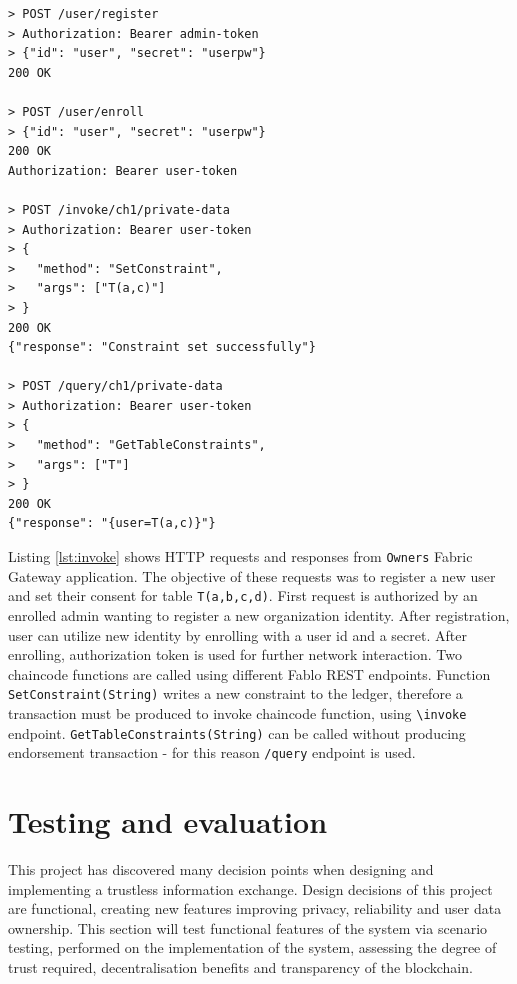 \documentclass[12pt]{article}
\begin{document}
    \begin{lstlisting}[style=http,
        caption={HTTP requests to issue Owners identities and set constraints}, label={lst:invoke}]
> POST /user/register
> Authorization: Bearer admin-token
> {"id": "user", "secret": "userpw"}
200 OK

> POST /user/enroll
> {"id": "user", "secret": "userpw"}
200 OK
Authorization: Bearer user-token

> POST /invoke/ch1/private-data
> Authorization: Bearer user-token
> {
>   "method": "SetConstraint",
>   "args": ["T(a,c)"]
> }
200 OK
{"response": "Constraint set successfully"}

> POST /query/ch1/private-data
> Authorization: Bearer user-token
> {
>   "method": "GetTableConstraints",
>   "args": ["T"]
> }
200 OK
{"response": "{user=T(a,c)}"}
    \end{lstlisting}

    Listing \ref{lst:invoke} shows HTTP requests and responses from \lstinline{Owners} Fabric Gateway application. The objective of these requests was to register a new user and set their consent for table \lstinline{T(a,b,c,d)}. First request is authorized by an enrolled admin wanting to register a new organization identity. After registration, user can utilize new identity by enrolling with a user id and a secret. After enrolling, authorization token is used for further network interaction. Two chaincode functions are called using different Fablo REST endpoints. Function \lstinline{SetConstraint(String)} writes a new constraint to the ledger, therefore a transaction must be produced to invoke chaincode function, using \lstinline{\invoke} endpoint. \lstinline{GetTableConstraints(String)} can be called without producing endorsement transaction - for this reason \lstinline{/query} endpoint is used.


    \section{Testing and evaluation}
    This project has discovered many decision points when designing and implementing a trustless information exchange. Design decisions of this project are functional, creating new features improving privacy, reliability and user data ownership. This section will test functional features of the system via scenario testing, performed on the implementation of the system, assessing the degree of trust required, decentralisation benefits and transparency of the blockchain.
\end{document}
